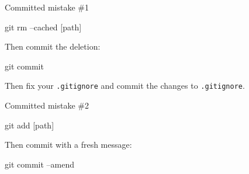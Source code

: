 \begin{frame}[fragile]{Committed mistake \#1}

  \color{ucMaroon}{I forgot to ignore something, and now it has changed and is
  chasing me around.}

  \qquad

  \color{black}{First, mark it for deletion in the staging area only:}

  \begin{gitCommand}git rm --cached [path]\end{gitCommand}

  Then commit the deletion:

  \begin{gitCommand}git commit\end{gitCommand}

  Then fix your \texttt{.gitignore} and commit the changes to \texttt{.gitignore}.

\end{frame}

\begin{frame}[fragile]{Committed mistake \#2}

  \color{ucMaroon}{My most recent commit is half-baked. Can I bake it better?}

  \qquad

  \color{black}{Stage your corrections:}

  \begin{gitCommand}git add [path]\end{gitCommand}

  Then commit with a fresh message:

  \begin{gitCommand}git commit --amend\end{gitCommand}
\end{frame}

